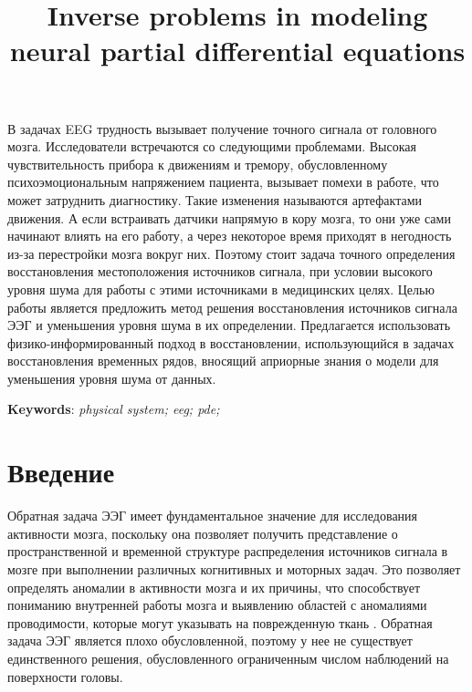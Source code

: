 \documentclass[sn-mathphys-num]{bst/sn-jnl}
\theoremstyle{thmstylethree}
\theoremstyle{thmstyletwo}
\theoremstyle{thmstyleone}
\begin{document}

\title
	[Inverse problems in nPDE] %
    {Inverse problems in modeling neural partial differential equations} %
\author*[1]{ }
\author*[1]{ }


\abstract
{В задачах EEG трудность вызывает получение точного сигнала от головного мозга. Исследователи встречаются со следующими проблемами. Высокая чувствительность прибора к движениям и тремору, обусловленному психоэмоциональным напряжением пациента, вызывает помехи в работе, что может затруднить диагностику. Такие изменения называются артефактами движения. А если встраивать датчики напрямую в кору мозга, то они уже сами начинают влиять на его работу, а через некоторое время приходят в негодность из-за перестройки мозга вокруг них. Поэтому стоит задача точного определения восстановления местоположения источников сигнала, при условии высокого уровня шума для работы с этими источниками в медицинских целях.
Целью работы является предложить метод решения восстановления источников сигнала ЭЭГ и уменьшения уровня шума в их определении.
Предлагается использовать физико-информированный подход в восстановлении, использующийся в задачах восстановления временных рядов, вносящий априорные знания о модели для уменьшения уровня шума от данных.


\textbf{Keywords}: \emph{physical system; eeg; pde; }}


\maketitle

\section{Введение}

Обратная задача ЭЭГ имеет фундаментальное значение для исследования активности мозга, поскольку она
позволяет получить представление о пространственной и временной структуре распределения источников сигнала в мозге при выполнении
различных когнитивных и моторных задач. Это позволяет определять аномалии в активности мозга и их причины, 
что способствует пониманию внутренней работы мозга и выявлению областей с аномалиями проводимости, 
которые могут указывать на поврежденную ткань \cite{PascualMarqui1999}. 
Обратная задача ЭЭГ является плохо обусловленной, поэтому у нее не существует единственного
решения, обусловленного ограниченным числом наблюдений на поверхности головы.
\end{document}
